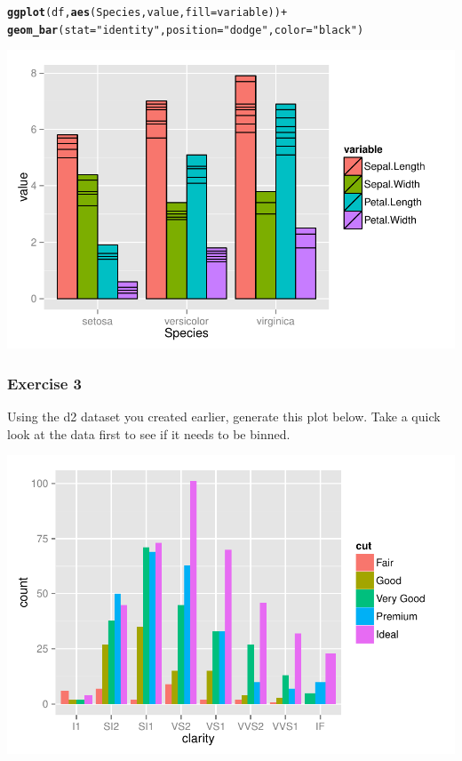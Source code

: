 \documentclass{beamer}\usepackage[]{graphicx}\usepackage[]{color}
\makeatletter
\newcommand{\hlstr}[1]{\textcolor[rgb]{0.192,0.494,0.8}{#1}}%
\newcommand{\hlopt}[1]{\textcolor[rgb]{0,0,0}{#1}}%
\newcommand{\hlstd}[1]{\textcolor[rgb]{0.345,0.345,0.345}{#1}}%
\newcommand{\hlkwc}[1]{\textcolor[rgb]{0.333,0.667,0.333}{#1}}%
\newcommand{\hlkwd}[1]{\textcolor[rgb]{0.737,0.353,0.396}{\textbf{#1}}}%
\newenvironment{kframe}{%
 \def\at@end@of@kframe{}%
 \ifinner\ifhmode%
  \def\at@end@of@kframe{\end{minipage}}%
  \begin{minipage}{\columnwidth}%
 \fi\fi%
 \def\FrameCommand##1{\hskip\@totalleftmargin \hskip-\fboxsep
 \colorbox{shadecolor}{##1}\hskip-\fboxsep
     \hskip-\linewidth \hskip-\@totalleftmargin \hskip\columnwidth}%
 \MakeFramed {\advance\hsize-\width
   \@totalleftmargin\z@ \linewidth\hsize
   \@setminipage}}%
 {\par\unskip\endMakeFramed%
 \at@end@of@kframe}
\newenvironment{knitrout}{}{} %
\makeatother
\begin{document}
\begin{frame}[fragile]
\begin{knitrout}\footnotesize
{}\color{fgcolor}\begin{kframe}
\begin{alltt}
\hlkwd{ggplot}\hlstd{(df,} \hlkwd{aes}\hlstd{(Species, value,} \hlkwc{fill} \hlstd{= variable))} \hlopt{+}
\hlkwd{geom_bar}\hlstd{(}\hlkwc{stat} \hlstd{=} \hlstr{"identity"}\hlstd{,} \hlkwc{position}\hlstd{=}\hlstr{"dodge"}\hlstd{,} \hlkwc{color}\hlstd{=}\hlstr{"black"}\hlstd{)}
\end{alltt}
\end{kframe}

{\centering \includegraphics[width=.75\linewidth]{figure/barthree2} 

}



\end{knitrout}

\end{frame}


\begin{frame}[fragile]
\frametitle{Exercise 3}
Using the d2 dataset you created earlier, generate this plot below. Take a quick look at the data first to see if it needs to be binned.
\begin{knitrout}\footnotesize
{}\color{fgcolor}

{\centering \includegraphics[width=.75\linewidth]{figure/ex3} 

}



\end{knitrout}

\end{frame}
\end{document}
